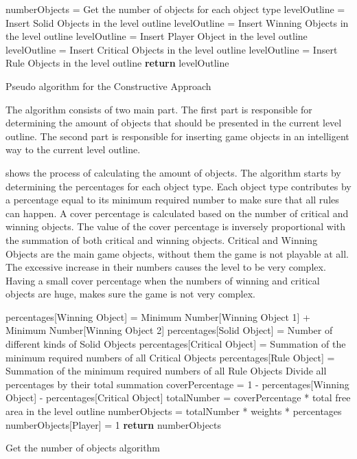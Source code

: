 \begin{algorithm}[H]  
	\BlankLine
	numberObjects = Get the number of objects for each object type\;
	\BlankLine
	levelOutline = Insert Solid Objects in the level outline\;
	levelOutline = Insert Winning Objects in the level outline\;
	levelOutline = Insert Player Object in the level outline\;
	levelOutline = Insert Critical Objects in the level outline\;
	levelOutline = Insert Rule Objects in the level outline\;
	\BlankLine
	\textbf{return} levelOutline\;
	\caption{Pseudo algorithm for the Constructive Approach}
	\label{Algorithm:constructiveApproach}
\end{algorithm}
The algorithm consists of two main part. The first part is responsible for determining the amount of objects that should be presented in the current level outline. The second part is responsible for inserting game objects in an intelligent way to the current level outline.\\\par

 shows the process of calculating the amount of objects. The algorithm starts by determining the percentages for each object type. Each object type contributes by a percentage equal to its minimum required number to make sure that all rules can happen. A cover percentage is calculated based on the number of critical and winning objects. The value of the cover percentage is inversely proportional with the summation of both critical and winning objects. Critical and Winning Objects are the main game objects, without them the game is not playable at all. The excessive increase in their numbers causes the level to be very complex. Having a small cover percentage when the numbers of winning and critical objects are huge, makes sure the game is not very complex.\\

\begin{algorithm}[H]
	\BlankLine
	percentages[Winning Object] = Minimum Number[Winning Object 1] + Minimum Number[Winning Object 2]\;
	percentages[Solid Object] = Number of different kinds of Solid Objects\;
	percentages[Critical Object] = Summation of the minimum required numbers of all Critical Objects\;
	percentages[Rule Object] = Summation of the minimum required numbers of all Rule Objects\;
	Divide all percentages by their total summation\;
	\BlankLine
	coverPercentage = 1 - percentages[Winning Object] - percentages[Critical Object]\;
	totalNumber = coverPercentage * total free area in the level outline\;
	numberObjects = totalNumber * weights * percentages\;
	numberObjects[Player] = 1\;
	\BlankLine
	\textbf{return} numberObjects\;
	\caption{Get the number of objects algorithm}
	\label{Algorithm:numberObjects}
\end{algorithm}

